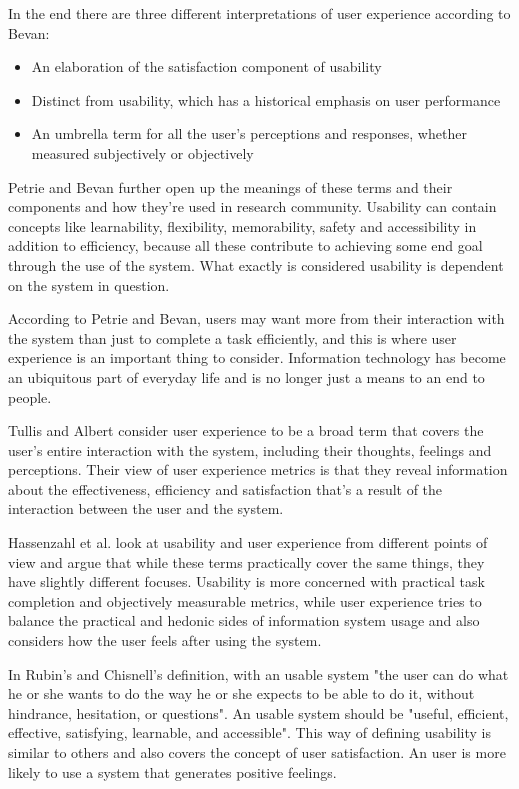 In the end there are three different interpretations of user experience according to Bevan: \begin{itemize}
\item An  elaboration  of  the  satisfaction  component  of usability
\item Distinct  from  usability,  which  has  a  historical emphasis on user performance
\item An  umbrella  term  for  all  the  user’s  perceptions  and responses,  whether  measured  subjectively  or objectively
\end{itemize}
\cite{bevan2009difference}

Petrie and Bevan further open up the meanings of these terms and their components and how they're used in research community. Usability can contain concepts like learnability, flexibility, memorability, safety and accessibility in addition to efficiency, because all these contribute to achieving some end goal through the use of the system. What exactly is considered usability is dependent on the system in question. 

According to Petrie and Bevan, users may want more from their interaction with the system than just to complete a task efficiently, and this is where user experience is an important thing to consider. Information technology has become an ubiquitous part of everyday life and is no longer just a means to an end to people.
\cite{bevanevaluation}

\cite{bevan2009difference, bevaniso, bevanevaluation, bevanstandard}

Tullis and Albert consider user experience to be a broad term that covers the user's entire interaction with the system, including their thoughts, feelings and perceptions. Their view of user experience metrics is that they reveal information about the effectiveness, efficiency and satisfaction that's a result of the interaction between the user and the system. \cite{albert2013measuring}

Hassenzahl et al. look at usability and user experience from different points of view and argue that while these terms practically cover the same things, they have slightly different focuses. Usability is more concerned with practical task completion and objectively measurable metrics, while user experience tries to balance the practical and hedonic sides of information system usage and also considers how the user feels after using the system.
\cite{hassenzahl2006user}

In Rubin's and Chisnell's definition, with an usable system "the user can do what he or she wants to do the way he or she expects to be able to do it, without hindrance, hesitation, or questions". An usable system should be "useful, efficient, effective, satisfying, learnable, and accessible". \cite{rubin2008handbook} This way of defining usability is similar to others and also covers the concept of user satisfaction. An user is more likely to use a system that generates positive feelings.


